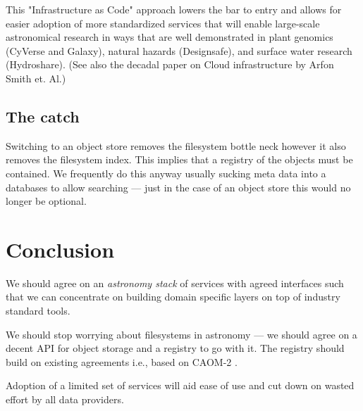 This "Infrastructure as Code" \citep{morris2016infrastructure} approach lowers the bar to entry
and allows for easier adoption of more standardized services that will enable large-scale
astronomical research in ways that are well demonstrated in plant genomics (CyVerse and Galaxy), natural hazards (Designsafe), and surface water research (Hydroshare). (See also the decadal paper on Cloud infrastructure by Arfon Smith et. Al.)

\subsection{The catch }
Switching to an object store removes the filesystem bottle neck however it also removes the filesystem index. This implies that a registry of the objects must be contained. We frequently do this anyway usually sucking meta data into a databases to allow searching --- just in the case of an object store this would no longer be  optional.


\section{Conclusion}
We should agree on an \emph{astronomy \gls{stack}} of services with agreed interfaces such that we can concentrate on building domain specific layers on top of industry standard tools.

We should stop worrying about filesystems in astronomy --- we should agree on a decent \gls{API} for object storage and a registry to go with it.
The registry should build on existing agreements i.e., based on \gls{CAOM}-2 \citep{2007ASPC..376..347D}.

Adoption of  a limited set of  services will  aid ease of use and cut down on wasted effort by all data providers.
